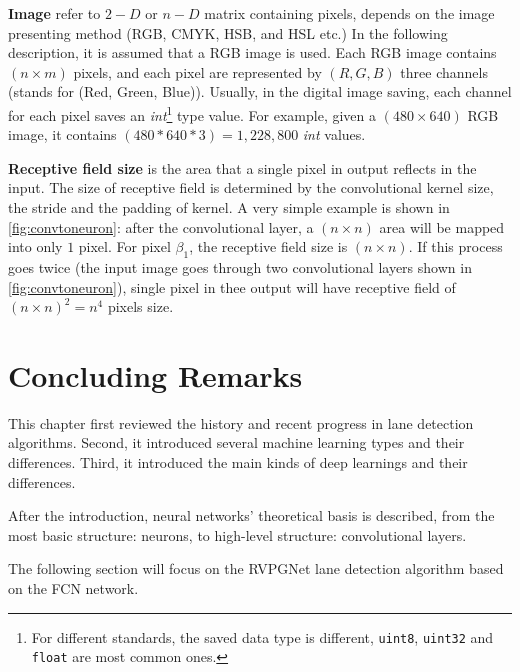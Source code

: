 \begin{spacing}{1.5}
\textbf{Image} refer to $2-D$ or $n-D$ matrix containing pixels, depends on the image presenting method (RGB, CMYK, HSB, and HSL etc.) In the following description, it is assumed that a RGB image is used. Each RGB image contains $(n \times m)$ pixels, and each pixel are represented by $(R,G,B)$ three channels (stands for (Red, Green, Blue)). Usually, in the digital image saving, each channel for each pixel saves an \textit{int}\footnote{For different standards, the saved data type is different, \texttt{uint8}, \texttt{uint32} and \texttt{float} are most common ones.} type value. For example, given a $(480 \times 640)$ RGB image, it contains $(480 * 640 * 3)=1,228,800$ \textit{int} values.

\textbf{Receptive field size} is the area that a single pixel in output reflects in the input. The size of receptive field is determined by the convolutional kernel size, the stride and the padding of kernel. A very simple example is shown in \autoref{fig:convtoneuron}: after the convolutional layer, a $(n \times n)$ area will be mapped into only $1$ pixel. For pixel $\beta_1$, the receptive field size is $(n \times n)$. If this process goes twice (the input image goes through two convolutional layers shown in \autoref{fig:convtoneuron}), single pixel in thee output will have receptive field of $(n \times n)^2=n^4$ pixels size.

\section{Concluding Remarks}

This chapter first reviewed the history and recent progress in lane detection algorithms. Second, it introduced several machine learning types and their differences. Third, it introduced the main kinds of deep learnings and their differences. 

After the introduction, neural networks' theoretical basis is described, from the most basic structure: neurons, to high-level structure: convolutional layers.

The following section will focus on the RVPGNet lane detection algorithm based on the FCN network.

\end{spacing}
\newpage
